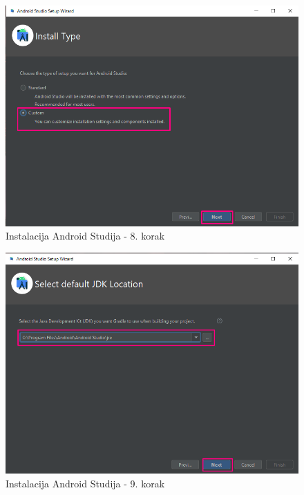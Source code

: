 \documentclass[11pt,a4paper,twoside]{article}
\begin{document}
\begin{figure}[!h]
	\centering
	\includegraphics[width=\textwidth]{install_08.png}
	\caption{Instalacija Android Studija - 8. korak}
	\label{fig:install_08}	
\end{figure}

\begin{figure}[!h]
	\centering
	\includegraphics[width=\textwidth]{install_09.png}
	\caption{Instalacija Android Studija - 9. korak}
	\label{fig:install_09}	
\end{figure}
\end{document}
